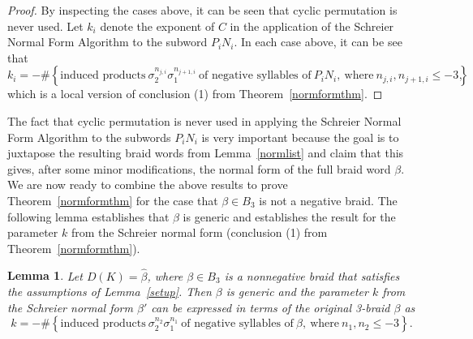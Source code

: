 \documentclass{article}
\newtheorem{lemma}{Lemma}[section]
\begin{document}
\begin{proof}
By inspecting the cases above, it can be seen that cyclic permutation is never used. Let $k_{i}$ denote the exponent of $C$ in the application of the Schreier Normal Form Algorithm to the subword $P_{i}N_{i}$. In each case above, it can be see that
$$k_{i}=-\# \left\{\text{induced\ products}\ \sigma_{2}^{n_{j,i}}\sigma_{1}^{n_{j+1,i}}\ \text{of\ negative\ syllables\ of}\ P_{i}N_{i},\ \text{where}\ n_{j,i}, n_{j+1,i} \leq -3 \right\},$$
which is a local version of conclusion (1) from Theorem~\ref{normformthm}. 

\end{proof}

The fact that cyclic permutation is never used in applying the Schreier Normal Form Algorithm to the subwords $P_{i}N_{i}$ is very important because the goal is to juxtapose the resulting braid words from Lemma~\ref{normlist} and claim that this gives, after some minor modifications, the normal form of the full braid word $\beta$. We are now ready to combine the above results to prove Theorem~\ref{normformthm} for the case that $\beta \in B_{3}$ is not a negative braid. The following lemma establishes that $\beta$ is generic and establishes the result for the parameter $k$ from the Schreier normal form (conclusion (1) from Theorem~\ref{normformthm}).  

\begin{lemma} \label{klemma} Let $D(K)=\widehat{\beta}$, where $\beta \in B_{3}$ is a nonnegative braid that satisfies the assumptions of Lemma~\ref{setup}. Then $\beta$ is generic and the parameter $k$ from the Schreier normal form $\beta'$ can be expressed in terms of the original 3-braid $\beta$ as 
$$k=-\# \left\{\text{induced\ products}\ \sigma_{2}^{n_{2}}\sigma_{1}^{n_{1}}\ \text{of\ negative\ syllables\ of}\ \beta,\ \text{where}\ n_{1}, n_{2} \leq -3 \right\}.$$
\end{lemma}
\end{document}

